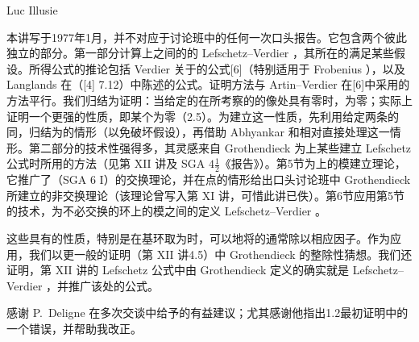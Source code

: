 \begin{center}Luc Illusie\end{center}

本讲写于1977年1月，并不对应于讨论班中的任何一次口头报告。它包含两个彼此独立的部分。第一部分计算上之间的的 Lefschetz--Verdier ，其所在的满足某些假设。所得公式的推论包括 Verdier 关于的公式[6]（特别适用于 Frobenius ），以及 Langlands 在（[4] 7.12）中陈述的公式。证明方法与 Artin--Verdier 在[6]中采用的方法平行。我们归结为证明：当给定的在所考察的的像处具有零时，为零；实际上证明一个更强的性质，即某个为零（2.5）。为建立这一性质，先利用给定两条的同，归结为的情形（以免破坏假设），再借助 Abhyankar 和相对直接处理这一情形。第二部分的技术性强得多，其灵感来自 Grothendieck 为上某些建立 Lefschetz 公式时所用的方法（见第 XII 讲及 SGA $4\frac12$《报告》）。第5节为上的模建立理论，它推广了（SGA 6 I）的交换理论，并在点的情形给出口头讨论班中 Grothendieck 所建立的非交换理论（该理论曾写入第 XI 讲，可惜此讲已佚）。第6节应用第5节的技术，为不必交换的环上的模之间的定义 Lefschetz--Verdier 。

这些具有的性质，特别是在基环取为时，可以地将的通常除以相应因子。作为应用，我们以更一般的证明（第 XII 讲4.5）中 Grothendieck 的整除性猜想。我们还证明，第 XII 讲的 Lefschetz 公式中由 Grothendieck 定义的确实就是 Lefschetz--Verdier ，并推广该处的公式。

感谢 P.~Deligne 在多次交谈中给予的有益建议；尤其感谢他指出1.2最初证明中的一个错误，并帮助我改正。

